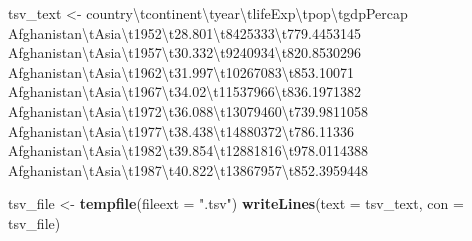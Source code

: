 \documentclass[
]{report}
\newenvironment{Shaded}{\begin{snugshade}}{\end{snugshade}}
\newcommand{\CharTok}[1]{\textcolor[rgb]{0.31,0.60,0.02}{#1}}
\newcommand{\DataTypeTok}[1]{\textcolor[rgb]{0.13,0.29,0.53}{#1}}
\newcommand{\KeywordTok}[1]{\textcolor[rgb]{0.13,0.29,0.53}{\textbf{#1}}}
\newcommand{\NormalTok}[1]{#1}
\newcommand{\StringTok}[1]{\textcolor[rgb]{0.31,0.60,0.02}{#1}}
\begin{document}
\begin{Shaded}
\begin{Highlighting}[]
\NormalTok{tsv\_text \textless{}{-}}\StringTok{ }
\StringTok{\textquotesingle{}country}\CharTok{\textbackslash{}t}\StringTok{continent}\CharTok{\textbackslash{}t}\StringTok{year}\CharTok{\textbackslash{}t}\StringTok{lifeExp}\CharTok{\textbackslash{}t}\StringTok{pop}\CharTok{\textbackslash{}t}\StringTok{gdpPercap     }
\StringTok{Afghanistan}\CharTok{\textbackslash{}t}\StringTok{Asia}\CharTok{\textbackslash{}t}\StringTok{1952}\CharTok{\textbackslash{}t}\StringTok{28.801}\CharTok{\textbackslash{}t}\StringTok{8425333}\CharTok{\textbackslash{}t}\StringTok{779.4453145}
\StringTok{Afghanistan}\CharTok{\textbackslash{}t}\StringTok{Asia}\CharTok{\textbackslash{}t}\StringTok{1957}\CharTok{\textbackslash{}t}\StringTok{30.332}\CharTok{\textbackslash{}t}\StringTok{9240934}\CharTok{\textbackslash{}t}\StringTok{820.8530296}
\StringTok{Afghanistan}\CharTok{\textbackslash{}t}\StringTok{Asia}\CharTok{\textbackslash{}t}\StringTok{1962}\CharTok{\textbackslash{}t}\StringTok{31.997}\CharTok{\textbackslash{}t}\StringTok{10267083}\CharTok{\textbackslash{}t}\StringTok{853.10071}
\StringTok{Afghanistan}\CharTok{\textbackslash{}t}\StringTok{Asia}\CharTok{\textbackslash{}t}\StringTok{1967}\CharTok{\textbackslash{}t}\StringTok{34.02}\CharTok{\textbackslash{}t}\StringTok{11537966}\CharTok{\textbackslash{}t}\StringTok{836.1971382}
\StringTok{Afghanistan}\CharTok{\textbackslash{}t}\StringTok{Asia}\CharTok{\textbackslash{}t}\StringTok{1972}\CharTok{\textbackslash{}t}\StringTok{36.088}\CharTok{\textbackslash{}t}\StringTok{13079460}\CharTok{\textbackslash{}t}\StringTok{739.9811058}
\StringTok{Afghanistan}\CharTok{\textbackslash{}t}\StringTok{Asia}\CharTok{\textbackslash{}t}\StringTok{1977}\CharTok{\textbackslash{}t}\StringTok{38.438}\CharTok{\textbackslash{}t}\StringTok{14880372}\CharTok{\textbackslash{}t}\StringTok{786.11336}
\StringTok{Afghanistan}\CharTok{\textbackslash{}t}\StringTok{Asia}\CharTok{\textbackslash{}t}\StringTok{1982}\CharTok{\textbackslash{}t}\StringTok{39.854}\CharTok{\textbackslash{}t}\StringTok{12881816}\CharTok{\textbackslash{}t}\StringTok{978.0114388}
\StringTok{Afghanistan}\CharTok{\textbackslash{}t}\StringTok{Asia}\CharTok{\textbackslash{}t}\StringTok{1987}\CharTok{\textbackslash{}t}\StringTok{40.822}\CharTok{\textbackslash{}t}\StringTok{13867957}\CharTok{\textbackslash{}t}\StringTok{852.3959448\textquotesingle{}}

\NormalTok{tsv\_file \textless{}{-}}\StringTok{ }\KeywordTok{tempfile}\NormalTok{(}\DataTypeTok{fileext =} \StringTok{".tsv"}\NormalTok{)}
\KeywordTok{writeLines}\NormalTok{(}\DataTypeTok{text =}\NormalTok{ tsv\_text, }\DataTypeTok{con =}\NormalTok{ tsv\_file)}
\end{Highlighting}
\end{Shaded}
\end{document}
